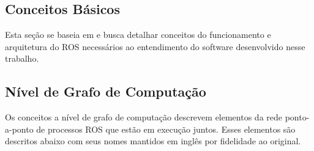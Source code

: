 \subsection{Conceitos Básicos}
Esta seção se baseia em \citep{ros_concepts} e busca detalhar conceitos do funcionamento e arquitetura do ROS necessários ao entendimento do software desenvolvido nesse trabalho. 


\subsection{Nível de Grafo de Computação}
Os conceitos a nível de grafo de computação descrevem elementos da rede ponto-a-ponto de processos ROS que estão em execução juntos. Esses elementos são descritos abaixo com seus nomes mantidos em inglês por fidelidade ao original.
